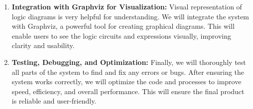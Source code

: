 \begin{enumerate}
    \item \textbf{Integration with Graphviz for Visualization:} Visual representation of logic diagrams is very helpful for understanding. We will integrate the system with Graphviz, a powerful tool for creating graphical diagrams. This will enable users to see the logic circuits and expressions visually, improving clarity and usability.

    \item \textbf{Testing, Debugging, and Optimization:} Finally, we will thoroughly test all parts of the system to find and fix any errors or bugs. After ensuring the system works correctly, we will optimize the code and processes to improve speed, efficiency, and overall performance. This will ensure the final product is reliable and user-friendly.
\end{enumerate}
